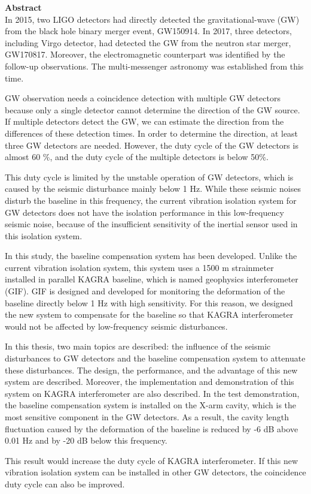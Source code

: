 \clearpage
{\huge \bf Abstract} \\

In 2015, two LIGO detectors had directly detected the gravitational-wave (GW) from the black hole binary merger event, GW150914. In 2017, three detectors, including Virgo detector, had detected the GW from the neutron star merger, GW170817. Moreover, the electromagnetic counterpart was identified by the follow-up observations. The multi-messenger astronomy was established from this time.

GW observation needs a coincidence detection with multiple GW detectors because only a single detector cannot determine the direction of the GW source. If multiple detectors detect the GW, we can estimate the direction from the differences of these detection times. In order to determine the direction, at least three GW detectors are needed. However, the duty cycle of the GW detectors is almost 60 \%, and the duty cycle of the multiple detectors is below 50\%. 

This duty cycle is limited by the unstable operation of GW detectors, which is caused by the seismic disturbance mainly below 1 Hz. While these seismic noises disturb the baseline in this frequency, the current vibration isolation system for GW detectors does not have the isolation performance in this low-frequency seismic noise, because of the insufficient sensitivity of the inertial sensor used in this isolation system. 

In this study, the baseline compensation system has been developed. Unlike the current vibration isolation system, this system uses a 1500 m strainmeter installed in parallel KAGRA baseline, which is named geophysics interferometer (GIF). GIF is designed and developed for monitoring the deformation of the baseline directly below 1 Hz with high sensitivity. For this reason, we designed the new system to compensate for the baseline so that KAGRA interferometer would not be affected by low-frequency seismic disturbances.

In this thesis, two main topics are described: the influence of the seismic disturbances to GW detectors and the baseline compensation system to attenuate these disturbances. The design, the performance, and the advantage of this new system are described. Moreover, the implementation and demonstration of this system on KAGRA interferometer are also described. In the test demonstration, the baseline compensation system is installed on the X-arm cavity, which is the most sensitive component in the GW detectors. As a result, the cavity length fluctuation caused by the deformation of the baseline is reduced by -6 dB above 0.01 Hz and by -20 dB below this frequency.

This result would increase the duty cycle of KAGRA interferometer. If this new vibration isolation system can be installed in other GW detectors, the coincidence duty cycle can also be improved. 
